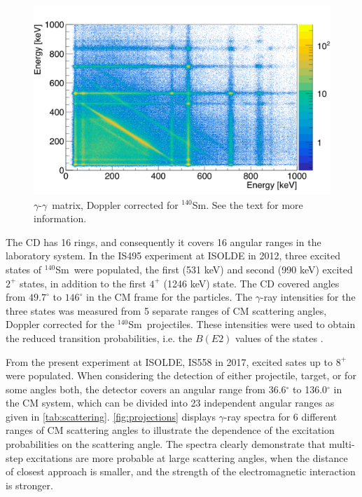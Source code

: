 \documentclass[twoside,english]{uiofysmaster/uiofysmaster}
\newcommand{\Sm}{$^{140}$Sm} %
\newcommand{\ga}{$\gamma$}
\let\orgautoref\autoref
\renewcommand{\autoref}
        {%
		 \def\sectionautorefname{Section}%
		 \def\subsectionautorefname{Section}%
		 \def\subsubsectionautorefname{Section}%
		 \def\chapterautorefname{Chapter}%
          \orgautoref}
\begin{document}
\begin{figure}[htb!]
	\centering
	\includegraphics[width=\textwidth]{../Plots/plotting/gg_dcB.png}
	\caption{\ga-\ga\ matrix, Doppler corrected for \Sm. 
	See the text for more information.}
	\label{fig:gg_dcB}
\end{figure}


The CD has 16 rings, and consequently it covers 16 angular ranges in the laboratory system.
In the IS495 experiment at ISOLDE in 2012, three excited states of \Sm\ were populated, the first (531 keV) and second (990 keV) excited $2^+$ states, in addition to the first $4^+$ (1246 keV) state.
The CD covered angles from $49.7^\circ$ to $146^\circ$ in the CM frame for the particles.
The \ga-ray intensities for the three states was measured from 5 separate ranges of CM scattering angles, Doppler corrected for the \Sm\ projectiles. 
These intensities were used to obtain the reduced transition probabilities, i.e. the $B(E2)$ values of the states \cite{Klintefjord2015, Klintefjord2016, BelloGarrote2015}.

From the present experiment at ISOLDE, IS558 in 2017, excited sates up to $8^+$ were populated. 
When considering the detection of either projectile, target, or for some angles both, the detector covers an angular range from 36.6$^\circ$ to 136.0$^\circ$ in the CM system, which can be divided into 23 independent angular ranges as given in \autoref{tab:scattering}. 
\autoref{fig:projections} displays \ga-ray spectra for 6 different ranges of CM scattering angles to illustrate the dependence of the excitation probabilities on the scattering angle. 
The spectra clearly demonstrate that multi-step excitations are more probable at large scattering angles, when the distance of closest approach is smaller, and the strength of the electromagnetic interaction is stronger. 
\end{document}
